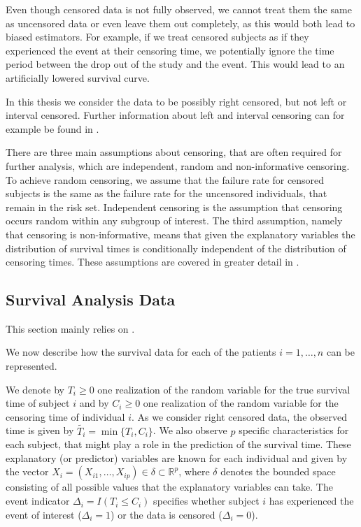 \documentclass[12pt, a4paper]{scrartcl}
\theoremstyle{definition}
\theoremstyle{plain}
\numberwithin{equation}{section}
\numberwithin{figure}{section}
\numberwithin{table}{section}
\begin{document}
	Even though censored data is not fully observed, we cannot treat them the same as uncensored data or even leave them out completely, as this would both lead to biased estimators.
	For example, if we treat censored subjects as if they experienced the event at their censoring time, we potentially ignore the time period between the drop out of the study and the event.
	This would lead to an artificially lowered survival curve.
		
	In this thesis we consider the data to be possibly right censored, but not left or interval censored.
	Further information about left and interval censoring can for example be found in \citet*{bookfailuretime}.
	
	There are three main assumptions about censoring, that are often required for further analysis, which are independent, random and non-informative censoring.
	To achieve random censoring, we assume that the failure rate for censored subjects is the same as the failure rate for the uncensored individuals, that remain in the risk set.
	Independent censoring is the assumption that censoring occurs random within any subgroup of interest.
	The third assumption, namely that censoring is non-informative, means that given the explanatory variables the distribution of survival times is conditionally independent of the distribution of censoring times.
	These assumptions are covered in greater detail in \citet*{bookfailuretime}.
	
	
	\subsection{Survival Analysis Data} \label{sabasics}
	
	This section mainly relies on \citet*{sabook}.
	
	We now describe how the survival data for each of the patients $i = 1, \dots, n$ can be represented.
	
	We denote by $T_i \geq 0$ one realization of the random variable for the true survival time of subject $i$ and by $C_i \geq 0$ one realization of the random variable for the censoring time of individual $i$.
	As we consider right censored data, the observed time is given by $\tilde{T_i} = \min\{T_i,C_i\}$.
	We also observe $p$ specific characteristics for each subject, that might play a role in the prediction of the survival time.
	These explanatory (or predictor) variables are known for each individual and given by the vector $X_i = (X_{i1}, \dots , X_{ip}) \in \delta \subset \mathbb{R}^p$, where $\delta$ denotes the bounded space consisting of all possible values that the explanatory variables can take.
	The event indicator $\Delta_i = I(T_i \leq C_i)$ specifies whether subject $i$ has experienced the event of interest ($\Delta_i=1$) or the data is censored ($\Delta_i=0$).
	
\end{document}
